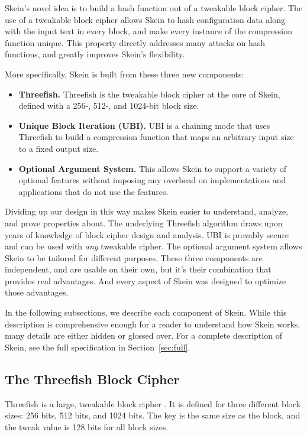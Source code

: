 \documentclass[11pt,twoside]{article}
\begin{document}
Skein's novel idea is to build a hash function out of a tweakable block cipher.  The use of a tweakable block cipher allows Skein to hash configuration data along with the input text in every block, and make every instance of the compression function unique.  This property directly addresses many attacks on hash functions, and greatly improves Skein's flexibility.

More specifically, Skein is built from these three new components:

\begin{itemize}
\item {\bf Threefish.}  Threefish is the tweakable block cipher at the core of Skein, defined with a 256-, 512-, and 1024-bit block size.
\item {\bf Unique Block Iteration (UBI).} UBI is a chaining mode that uses Threefish to build a compression function that maps an arbitrary input size to a fixed output size.
\item {\bf Optional Argument System.} This allows Skein to support a variety of optional features without imposing any overhead on implementations and applications that do not use the features.
\end{itemize}

Dividing up our design in this way makes Skein easier to understand, analyze, and prove properties about.  The underlying Threefish algorithm draws upon years of knowledge of block cipher design and analysis.  UBI is provably secure and can be used with \emph{any} tweakable cipher.  The optional argument system allows Skein to be tailored for different purposes.  These three components are independent, and are usable on their own, but it's their combination that provides real advantages.  And every aspect of Skein was designed to optimize those advantages.

In the following subsections, we describe each component of Skein.  While this description is comprehensive enough for a reader to understand how Skein works, many details are either hidden or glossed over.  For a complete description of Skein, see the full specification in Section~\ref{sec:full}.

\subsection{The Threefish Block Cipher}

Threefish is a large, tweakable block cipher \cite{LRW02}.  It is defined for three different block sizes: 256 bits, 512 bits, and 1024 bits.  The key is the same size as the block, and the tweak value is 128 bits for all block sizes.
\end{document}
